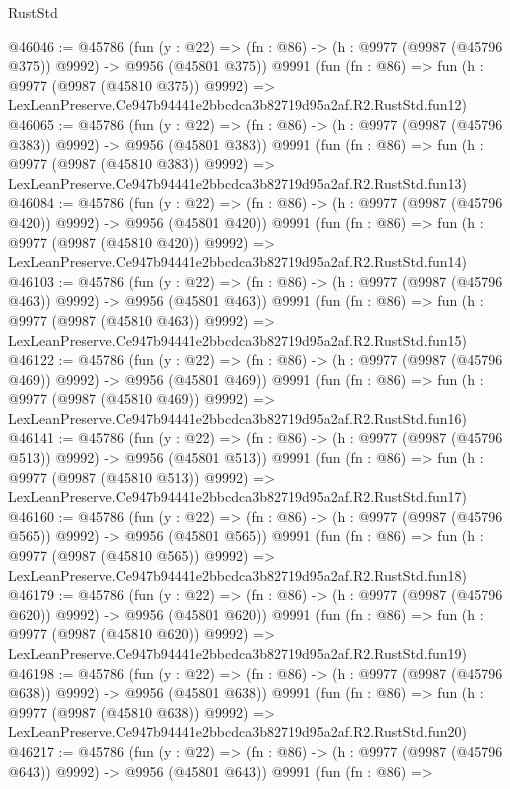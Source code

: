 \begin{lexlean}{RustStd}
\begin{coremodule}
@46046 := @45786
    (fun (y : @22) => (fn : @86) -> (h : @9977 (@9987 (@45796 @375)) @9992) -> @9956 (@45801 @375))
    @9991
    (fun (fn : @86) =>
    fun (h : @9977 (@9987 (@45810 @375)) @9992) =>
    LexLeanPreserve.Ce947b94441e2bbcdca3b82719d95a2af.R2.RustStd.fun12)
@46065 := @45786
    (fun (y : @22) => (fn : @86) -> (h : @9977 (@9987 (@45796 @383)) @9992) -> @9956 (@45801 @383))
    @9991
    (fun (fn : @86) =>
    fun (h : @9977 (@9987 (@45810 @383)) @9992) =>
    LexLeanPreserve.Ce947b94441e2bbcdca3b82719d95a2af.R2.RustStd.fun13)
@46084 := @45786
    (fun (y : @22) => (fn : @86) -> (h : @9977 (@9987 (@45796 @420)) @9992) -> @9956 (@45801 @420))
    @9991
    (fun (fn : @86) =>
    fun (h : @9977 (@9987 (@45810 @420)) @9992) =>
    LexLeanPreserve.Ce947b94441e2bbcdca3b82719d95a2af.R2.RustStd.fun14)
@46103 := @45786
    (fun (y : @22) => (fn : @86) -> (h : @9977 (@9987 (@45796 @463)) @9992) -> @9956 (@45801 @463))
    @9991
    (fun (fn : @86) =>
    fun (h : @9977 (@9987 (@45810 @463)) @9992) =>
    LexLeanPreserve.Ce947b94441e2bbcdca3b82719d95a2af.R2.RustStd.fun15)
@46122 := @45786
    (fun (y : @22) => (fn : @86) -> (h : @9977 (@9987 (@45796 @469)) @9992) -> @9956 (@45801 @469))
    @9991
    (fun (fn : @86) =>
    fun (h : @9977 (@9987 (@45810 @469)) @9992) =>
    LexLeanPreserve.Ce947b94441e2bbcdca3b82719d95a2af.R2.RustStd.fun16)
@46141 := @45786
    (fun (y : @22) => (fn : @86) -> (h : @9977 (@9987 (@45796 @513)) @9992) -> @9956 (@45801 @513))
    @9991
    (fun (fn : @86) =>
    fun (h : @9977 (@9987 (@45810 @513)) @9992) =>
    LexLeanPreserve.Ce947b94441e2bbcdca3b82719d95a2af.R2.RustStd.fun17)
@46160 := @45786
    (fun (y : @22) => (fn : @86) -> (h : @9977 (@9987 (@45796 @565)) @9992) -> @9956 (@45801 @565))
    @9991
    (fun (fn : @86) =>
    fun (h : @9977 (@9987 (@45810 @565)) @9992) =>
    LexLeanPreserve.Ce947b94441e2bbcdca3b82719d95a2af.R2.RustStd.fun18)
@46179 := @45786
    (fun (y : @22) => (fn : @86) -> (h : @9977 (@9987 (@45796 @620)) @9992) -> @9956 (@45801 @620))
    @9991
    (fun (fn : @86) =>
    fun (h : @9977 (@9987 (@45810 @620)) @9992) =>
    LexLeanPreserve.Ce947b94441e2bbcdca3b82719d95a2af.R2.RustStd.fun19)
@46198 := @45786
    (fun (y : @22) => (fn : @86) -> (h : @9977 (@9987 (@45796 @638)) @9992) -> @9956 (@45801 @638))
    @9991
    (fun (fn : @86) =>
    fun (h : @9977 (@9987 (@45810 @638)) @9992) =>
    LexLeanPreserve.Ce947b94441e2bbcdca3b82719d95a2af.R2.RustStd.fun20)
@46217 := @45786
    (fun (y : @22) => (fn : @86) -> (h : @9977 (@9987 (@45796 @643)) @9992) -> @9956 (@45801 @643))
    @9991
    (fun (fn : @86) =>

\end{coremodule}
\end{lexlean}
